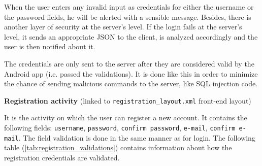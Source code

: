 When the user enters any invalid input as credentials for either the username or the password fields, he will be alerted with a sensible message. Besides, there is another layer of security at the server's level. If the login fails at the server's level, it sends an appropriate JSON to the client, is analyzed accordingly and the user is then notified about it.

The credentials are only sent to the server after they are considered valid by the Android app (i.e. passed the validations). It is done like this in order to minimize the chance of sending malicious commands to the server, like SQL injection code.

\textbf{Registration activity} (linked to \verb|registration_layout.xml| front-end layout)

It is the activity on which the user can register a new account. It contains the following fields: \verb|username|, \verb|password|, \verb|confirm password|, \verb|e-mail|, \verb|confirm e-mail|. The field validation is done in the same manner as for login. The following table (\ref{tab:registration_validations}) contains information about how the registration credentials are validated.

